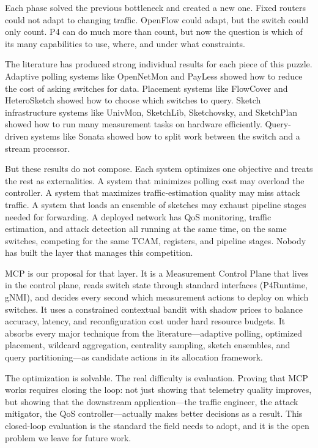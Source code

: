 \documentclass[letterpaper,twocolumn,10pt]{article}
\newcommand{\system}{MCP\xspace}
\begin{document}
Each phase solved the previous bottleneck and created a new one.
Fixed routers could not adapt to changing traffic. OpenFlow could
adapt, but the switch could only count. P4 can do much more than
count, but now the question is which of its many capabilities to
use, where, and under what constraints.

The literature has produced strong individual results for each
piece of this puzzle. Adaptive polling systems like OpenNetMon and
PayLess showed how to reduce the cost of asking switches for
data. Placement systems like FlowCover and HeteroSketch showed
how to choose which switches to query. Sketch infrastructure
systems like UnivMon, SketchLib, Sketchovsky, and SketchPlan
showed how to run many measurement tasks on hardware efficiently.
Query-driven systems like Sonata showed how to split work between
the switch and a stream processor.

But these results do not compose. Each system optimizes one
objective and treats the rest as externalities. A system that
minimizes polling cost may overload the controller. A system
that maximizes traffic-estimation quality may miss attack traffic.
A system that loads an ensemble of sketches may exhaust pipeline
stages needed for forwarding. A deployed network has QoS
monitoring, traffic estimation, and attack detection all running
at the same time, on the same switches, competing for the same
TCAM, registers, and pipeline stages. Nobody has built the layer
that manages this competition.

\system is our proposal for that layer. It is a Measurement
Control Plane that lives in the control plane, reads switch state
through standard interfaces (P4Runtime, gNMI), and decides every
second which measurement actions to deploy on which switches. It
uses a constrained contextual bandit with shadow prices to
balance accuracy, latency, and reconfiguration cost under hard
resource budgets. It absorbs every major technique from the
literature---adaptive polling, optimized placement, wildcard
aggregation, centrality sampling, sketch ensembles, and query
partitioning---as candidate actions in its allocation framework.

The optimization is solvable. The real difficulty is evaluation.
Proving that \system works requires closing the loop: not just
showing that telemetry quality improves, but showing that the
downstream application---the traffic engineer, the attack
mitigator, the QoS controller---actually makes better decisions
as a result. This closed-loop evaluation is the standard the
field needs to adopt, and it is the open problem we leave for
future work.



\end{document}
